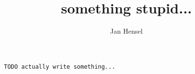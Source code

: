\documentclass{article}
\author{Jan Hensel}
\title{something stupid...}
\newcommand{\re}[0]{\color{red_custom}}
\newcommand{\todo}[1]{\texttt{\re TODO #1\\}}
\begin{document}
\maketitle
\todo{actually write something...}
\end{document}
